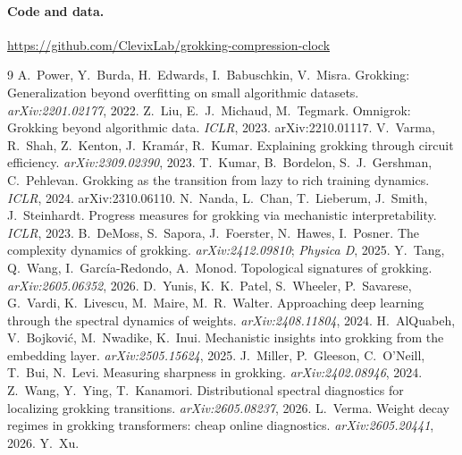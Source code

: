 \documentclass[11pt]{article}
\begin{document}
\paragraph{Code and data.} \url{https://github.com/ClevixLab/grokking-compression-clock}

\begin{thebibliography}{9}
\small
{} A.~Power, Y.~Burda, H.~Edwards, I.~Babuschkin, V.~Misra.
Grokking: Generalization beyond overfitting on small algorithmic datasets. \emph{arXiv:2201.02177}, 2022.
 Z.~Liu, E.~J.~Michaud, M.~Tegmark. Omnigrok: Grokking beyond algorithmic data. \emph{ICLR}, 2023. arXiv:2210.01117.
 V.~Varma, R.~Shah, Z.~Kenton, J.~Kram\'ar, R.~Kumar. Explaining grokking through circuit efficiency. \emph{arXiv:2309.02390}, 2023.
 T.~Kumar, B.~Bordelon, S.~J.~Gershman, C.~Pehlevan. Grokking as the transition from lazy to rich training dynamics. \emph{ICLR}, 2024. arXiv:2310.06110.
 N.~Nanda, L.~Chan, T.~Lieberum, J.~Smith, J.~Steinhardt.
Progress measures for grokking via mechanistic interpretability. \emph{ICLR}, 2023.
 B.~DeMoss, S.~Sapora, J.~Foerster, N.~Hawes, I.~Posner.
The complexity dynamics of grokking. \emph{arXiv:2412.09810}; \emph{Physica D}, 2025.
 Y.~Tang, Q.~Wang, I.~Garc\'ia-Redondo, A.~Monod.
Topological signatures of grokking. \emph{arXiv:2605.06352}, 2026.
 D.~Yunis, K.~K.~Patel, S.~Wheeler, P.~Savarese, G.~Vardi, K.~Livescu, M.~Maire, M.~R.~Walter.
Approaching deep learning through the spectral dynamics of weights. \emph{arXiv:2408.11804}, 2024.
 H.~AlQuabeh, V.~Bojkovi\'c, M.~Nwadike, K.~Inui.
Mechanistic insights into grokking from the embedding layer. \emph{arXiv:2505.15624}, 2025.
 J.~Miller, P.~Gleeson, C.~O'Neill, T.~Bui, N.~Levi.
Measuring sharpness in grokking. \emph{arXiv:2402.08946}, 2024.
 Z.~Wang, Y.~Ying, T.~Kanamori.
Distributional spectral diagnostics for localizing grokking transitions. \emph{arXiv:2605.08237}, 2026.
 L.~Verma.
Weight decay regimes in grokking transformers: cheap online diagnostics. \emph{arXiv:2605.20441}, 2026.
 Y.~Xu.

\end{thebibliography}
\end{document}
